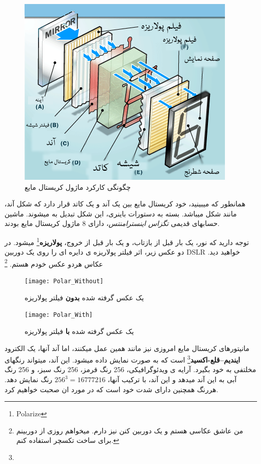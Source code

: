 \documentclass[14pt,a4paper]{memoir}
\begin{document}
	 \begin{figure}[H]
	 	\centering
	 	\includegraphics[scale=0.7]{LCD}
	 	\caption{چگونگی کارکرد ماژول کریستال مایع}
	 \end{figure}
	 
	 همانطور که میبینید، خود کریستال مایع بین یک آند و یک کاتد قرار دارد که شکل آند، مانند شکل  میباشد. بسته به دستورات باینری، این شکل تبدیل به  میشوند. ماشین حسابهای قدیمی \textit{تگزاس اینسترامنتس}، دارای 8 ماژول کریستال مایع بودند. 
	
	
	توجه دارید که نور، یک بار قبل از بازتاب، و یک بار قبل از خروج، \textbf{پولاریزه}\footnote{Polarize} میشود. در دو عکس زیر، اثر فیلتر پولاریزه ی دایره ای را روی یک دوربین DSLR خواهید دید. عکاس هردو عکس خودم هستم. \footnote{من عاشق عکاسی هستم و یک دوربین  کنن نیز دارم. میخواهم روزی از دوربینم برای ساخت تکسچر استفاده کنم.}
	
	\begin{figure}[H]
		\centering
		\texttt{[image: Polar\_Without]}
		\caption{یک عکس گرفته شده \textbf{بدون} فیلتر پولاریزه}
		\texttt{[image: Polar\_With]}
		\caption{یک عکس گرفته شده \textbf{با} فیلتر پولاریزه }
	\end{figure}



مانیتورهای کریستال مایع امروزی نیز مانند همین عمل میکنند، اما آند آنها، یک الکترود \textbf{ایندیم--قلع-اکسید}\footnote{} است که به صورت  نمایش داده میشود. این آند، میتواند رنگهای مخلتفی به خود بگیرد.  آرایه ی ویدئوگرافیکی، 256 رنگ قرمز، 256 رنگ سبز، و 256 رنگ آبی به این آند میدهد و این آند، با ترکیب آنها، $ 256^3 = 16777216 $ رنگ نمایش دهد. هررنگ همچنین دارای شدت خود است که در مورد ان صحبت خواهیم کرد. 
\end{document}
